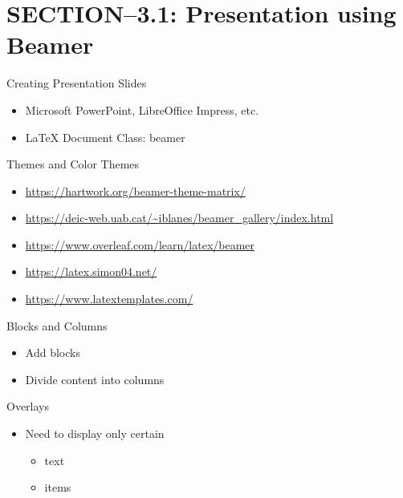 


\maketitle
\section{SECTION--3.1: Presentation using Beamer}
\begin{frame}[t]{Creating Presentation Slides}
	\begin{itemize}
		\item Microsoft PowerPoint, LibreOffice Impress, etc.
		\item {\LaTeX} Document Class: beamer	
	\end{itemize}
\end{frame}


\begin{frame}[t]{Themes and Color Themes}
	\begin{itemize}
		\item \url{https://hartwork.org/beamer-theme-matrix/}
		\item \url{https://deic-web.uab.cat/~iblanes/beamer_gallery/index.html}
		\item \url{https://www.overleaf.com/learn/latex/beamer}
		\item \url{https://latex.simon04.net/}
		\item \url{https://www.latextemplates.com/}
	\end{itemize}
\end{frame}

\begin{frame}[t]{Blocks and Columns}
	\begin{itemize}
		\item Add blocks
		\item Divide content into columns
	\end{itemize}
\end{frame}

\begin{frame}[t]{Overlays}
	\begin{itemize}
		\item Need to display only certain
		\begin{itemize}
			\item text
			\item items
		\end{itemize}
	\end{itemize}
\end{frame}

